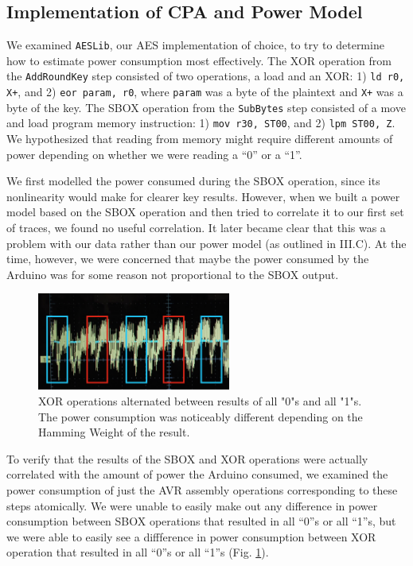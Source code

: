 \documentclass[journal]{ieee_style}
\begin{document}
\subsection{Implementation of CPA and Power Model}

We examined \texttt{AESLib}, our AES implementation of choice, to try to determine how to estimate power consumption most effectively. The XOR operation from the \texttt{AddRoundKey} step consisted of two operations, a load and an XOR: 1) \texttt{ld r0, X+}, and 2) \texttt{eor param, r0}, where \texttt{param} was a byte of the plaintext and \texttt{X+} was a byte of the key. The SBOX operation from the \texttt{SubBytes} step consisted of a move and load program memory instruction: 1) \texttt{mov r30, ST00}, and 2) \texttt{lpm ST00, Z}. We hypothesized that reading from memory might require different amounts of power depending on whether we were reading a ``0'' or a ``1''. 

We first modelled the power consumed during the SBOX operation, since its nonlinearity would make for clearer key results. However, when we built a power model based on the SBOX operation and then tried to correlate it to our first set of traces, we found no useful correlation. It later became clear that this was a problem with our data rather than our power model (as outlined in III.C). At the time, however, we were concerned that maybe the power consumed by the Arduino was for some reason not proportional to the SBOX output. 

\begin{figure}[!t]
\centering
\includegraphics[width=2.5in]{XOR_PC}
\caption{XOR operations alternated between results of all "0"s and all "1"s. The power consumption was noticeably different depending on the Hamming Weight of the result.}
\label{fig_xor}
\end{figure}

To verify that the results of the SBOX and XOR operations were actually correlated with the amount of power the Arduino consumed,  we examined the power consumption of just the AVR assembly operations corresponding to these steps atomically. We were unable to easily make out any difference in power consumption between SBOX operations that resulted in all ``0''s or all ``1''s, but we were able to easily see a diffference in power consumption between XOR operation that resulted in all ``0''s or all ``1''s (Fig. \ref{fig_xor}).
\end{document}
